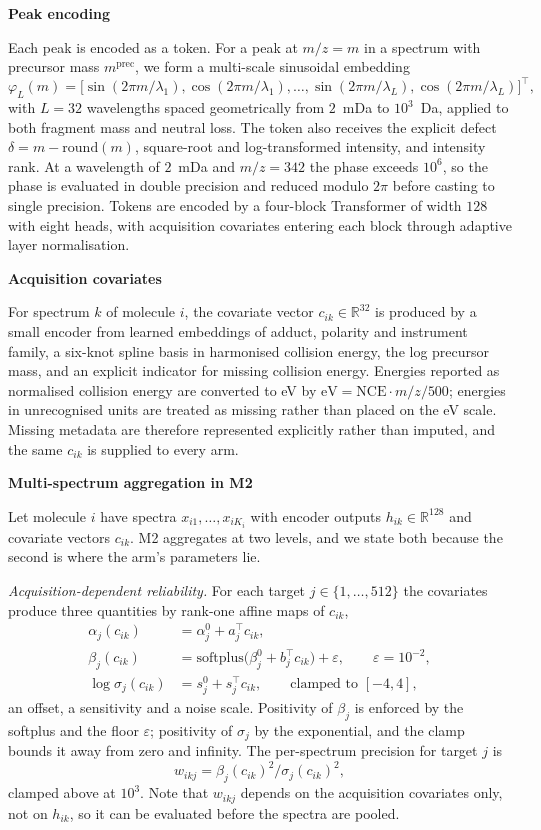 \documentclass[11pt]{article}
\newcommand{\hd}[1]{\medskip\par\noindent\textbf{#1}\par\nobreak\vspace{2pt}\noindent\ignorespaces}
\newcommand{\mz}{\ensuremath{m/z}}
\begin{document}
\hd{Peak encoding}
Each peak is encoded as a token. For a peak at $\mz=m$ in a spectrum with precursor mass $m^{\mathrm{prec}}$, we form a multi-scale sinusoidal embedding
\begin{equation}
\varphi_L(m)=\bigl[\sin(2\pi m/\lambda_1),\cos(2\pi m/\lambda_1),\ldots,\sin(2\pi m/\lambda_L),\cos(2\pi m/\lambda_L)\bigr]^\top,
\end{equation}
with $L=32$ wavelengths spaced geometrically from $2$~mDa to $10^3$~Da, applied to both fragment mass and neutral loss. The token also receives the explicit defect $\delta=m-\mathrm{round}(m)$, square-root and log-transformed intensity, and intensity rank. At a wavelength of $2$~mDa and $\mz=342$ the phase exceeds $10^6$, so the phase is evaluated in double precision and reduced modulo $2\pi$ before casting to single precision. Tokens are encoded by a four-block Transformer of width $128$ with eight heads, with acquisition covariates entering each block through adaptive layer normalisation.

\hd{Acquisition covariates}
For spectrum $k$ of molecule $i$, the covariate vector $c_{ik}\in\mathbb{R}^{32}$ is produced by a small encoder from learned embeddings of adduct, polarity and instrument family, a six-knot spline basis in harmonised collision energy, the log precursor mass, and an explicit indicator for missing collision energy. Energies reported as normalised collision energy are converted to eV by $\mathrm{eV}=\mathrm{NCE}\cdot \mz/500$; energies in unrecognised units are treated as missing rather than placed on the eV scale. Missing metadata are therefore represented explicitly rather than imputed, and the same $c_{ik}$ is supplied to every arm.

\hd{Multi-spectrum aggregation in M2}
Let molecule $i$ have spectra $x_{i1},\dots,x_{iK_i}$ with encoder outputs $h_{ik}\in\mathbb{R}^{128}$ and covariate vectors $c_{ik}$. M2 aggregates at two levels, and we state both because the second is where the arm's parameters lie.

\emph{Acquisition-dependent reliability.} For each target $j\in\{1,\dots,512\}$ the covariates produce three quantities by rank-one affine maps of $c_{ik}$,
\begin{align}
\alpha_j(c_{ik}) &= \alpha^0_j + a_j^\top c_{ik}, \\
\beta_j(c_{ik}) &= \mathrm{softplus}\bigl(\beta^0_j + b_j^\top c_{ik}\bigr) + \varepsilon, \qquad \varepsilon = 10^{-2},\\
\log \sigma_j(c_{ik}) &= s^0_j + s_j^\top c_{ik}, \qquad \text{clamped to } [-4, 4],
\end{align}
an offset, a sensitivity and a noise scale. Positivity of $\beta_j$ is enforced by the softplus and the floor $\varepsilon$; positivity of $\sigma_j$ by the exponential, and the clamp bounds it away from zero and infinity. The per-spectrum precision for target $j$ is
\begin{equation}
w_{ikj} = \beta_j(c_{ik})^2/\sigma_j(c_{ik})^2,
\label{eq:prec}
\end{equation}
clamped above at $10^3$. Note that $w_{ikj}$ depends on the acquisition covariates only, not on $h_{ik}$, so it can be evaluated before the spectra are pooled.
\end{document}

